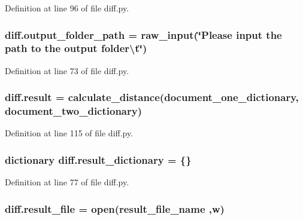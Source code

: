 Definition at line 96 of file diff.\+py.

\subsubsection[{\texorpdfstring{output\+\_\+folder\+\_\+path}{output_folder_path}}]{\setlength{\rightskip}{0pt plus 5cm}diff.\+output\+\_\+folder\+\_\+path = raw\+\_\+input(\char`\"{}Please input the path to the output folder\textbackslash{}t\char`\"{})}\hypertarget{namespacediff_aed454348ccff9ceb835a6c22de15fa95}{}\label{namespacediff_aed454348ccff9ceb835a6c22de15fa95}


Definition at line 73 of file diff.\+py.

\subsubsection[{\texorpdfstring{result}{result}}]{\setlength{\rightskip}{0pt plus 5cm}diff.\+result = {\bf calculate\+\_\+distance}({\bf document\+\_\+one\+\_\+dictionary}, {\bf document\+\_\+two\+\_\+dictionary})}\hypertarget{namespacediff_a5df2e8041c6fff30558b49edee35438a}{}\label{namespacediff_a5df2e8041c6fff30558b49edee35438a}


Definition at line 115 of file diff.\+py.

\subsubsection[{\texorpdfstring{result\+\_\+dictionary}{result_dictionary}}]{\setlength{\rightskip}{0pt plus 5cm}dictionary diff.\+result\+\_\+dictionary = \{\}}\hypertarget{namespacediff_a08d29f91abd1bc75aa7d8ecb3aa39c91}{}\label{namespacediff_a08d29f91abd1bc75aa7d8ecb3aa39c91}


Definition at line 77 of file diff.\+py.

\subsubsection[{\texorpdfstring{result\+\_\+file}{result_file}}]{\setlength{\rightskip}{0pt plus 5cm}diff.\+result\+\_\+file = open({\bf result\+\_\+file\+\_\+name} ,\textquotesingle{}w\textquotesingle{})}\hypertarget{namespacediff_aa1be62f435ce37ca93ba61d4ad88c0c9}{}\label{namespacediff_aa1be62f435ce37ca93ba61d4ad88c0c9}


